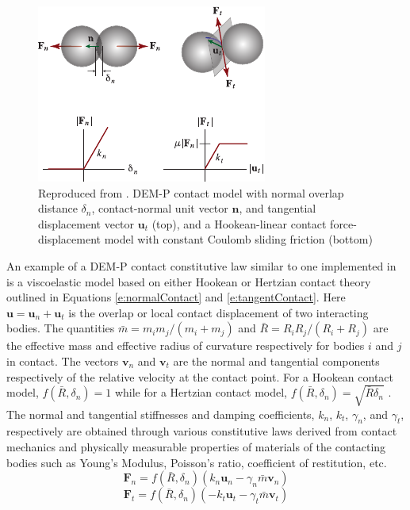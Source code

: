 \documentclass[12pt,onecolumn]{report}
\newcommand{\CHRONO}{{\sffamily{{Chrono}}}}
\begin{document}
\begin{figure}
	\centering
	\includegraphics[width=0.8\columnwidth]{Figs/DEM-P_Contact_Model.pdf}
	\caption{\small Reproduced from \protect\cite{Chrono2016}. DEM-P contact model with normal overlap distance $\delta_n$, contact-normal unit vector $\boldsymbol{n}$, and tangential displacement vector $\boldsymbol{u}_t$ (top), and a Hookean-linear contact force-displacement model with constant Coulomb sliding friction (bottom) }  
	\label{fig:Penalty}
\end{figure}

An example of a DEM-P contact constitutive law similar to one implemented in {\CHRONO} is a viscoelastic model based on either Hookean or Hertzian contact theory outlined in Equations \eqref{e:normalContact} and \eqref{e:tangentContact}. Here $\boldsymbol{u} = \boldsymbol{u}_n + \boldsymbol{u}_t$ is the overlap or local contact displacement of two interacting bodies. The quantities $\bar{m} = m_i m_j/\left(m_i + m_j\right)$ and $\bar{R} = R_i R_j/\left(R_i + R_j\right)$ are the effective mass and effective radius of curvature respectively for bodies $i$ and $j$ in contact. The vectors $\boldsymbol{v}_n$ and $\boldsymbol{v}_t$ are the normal and tangential components respectively of the relative velocity at the contact point. For a Hookean contact model, $f\left(\bar{R},\delta_n\right) = 1$ while for a Hertzian contact model, $f\left(\bar{R},\delta_n\right) = \sqrt{\bar{R}\delta_n}$ \cite{silbert2001granular,zhang2005jamming,MachadoMoreiraFloresLankarani2012}. The normal and tangential stiffnesses and damping coefficients, $k_n$, $k_t$, $\gamma_n$, and $\gamma_t$, respectively are obtained through various constitutive laws derived from contact mechanics and physically measurable properties of materials of the contacting bodies such as Young's Modulus, Poisson's ratio, coefficient of restitution, etc. 
%
\begin{equation}\label{e:normalContact}
\boldsymbol{F}_n = f\left(\bar{R},\delta_n\right)\left(k_n \boldsymbol{u}_n - \gamma_n \bar{m}\boldsymbol{v}_n\right)
\end{equation}
%
\begin{equation}\label{e:tangentContact}
\boldsymbol{F}_t = f\left(\bar{R},\delta_n\right)\left(-k_t \boldsymbol{u}_t - \gamma_t \bar{m}\boldsymbol{v}_t\right)
\end{equation}
\end{document}
